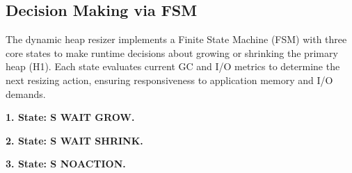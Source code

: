 \subsection{Decision Making via FSM}

The dynamic heap resizer implements a Finite State Machine (FSM) with three core states to make runtime decisions about growing or shrinking the primary heap (H1). Each state evaluates current GC and I/O metrics to determine the next resizing action, ensuring responsiveness to application memory and I/O demands.

\textbf{1. State: S WAIT GROW.} \

\textbf{2. State: S WAIT SHRINK.} \


\textbf{3. State: S NOACTION.} \

